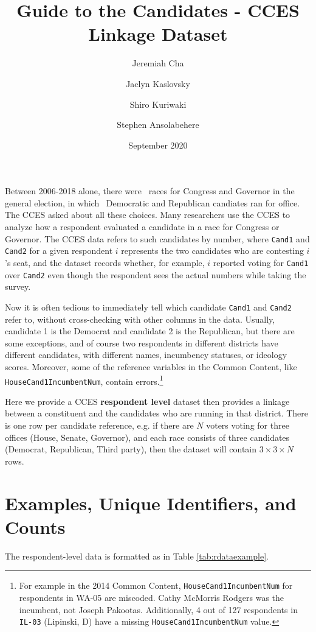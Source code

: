\documentclass[12pt]{article}
\title{\large\textbf{Guide to the Candidates - CCES Linkage Dataset}}
\author[1]{\normalsize Jeremiah Cha}
\author[2]{\normalsize Jaclyn Kaslovsky}
\author[3]{\normalsize Shiro Kuriwaki}
\author[1]{\normalsize Stephen Ansolabehere}
\affil[1]{\footnotesize Department of Government, Harvard University.}
\affil[2]{\footnotesize Department of Political Science, Rice University}
\affil[3]{\footnotesize To be Department of Political Science, Yale University}
\date{\normalsize September 2020}
\begin{document}
\maketitle 


Between 2006-2018 alone, there were \unskip \ races for Congress and Governor in the general election, in which \unskip \ Democratic and Republican candiates ran for office. The CCES asked about all these choices. Many researchers use the CCES to analyze how a respondent evaluated a candidate in a race for Congress or Governor. The CCES data refers to such candidates by number, where \texttt{Cand1} and \texttt{Cand2}  for a given respondent \(i\) represents the two candidates who are contesting \(i\)'s seat, and the dataset records whether, for example, \(i\) reported voting for \texttt{Cand1} over \texttt{Cand2} even though the respondent sees the actual numbers while taking the survey.  


Now it is often tedious to immediately tell which candidate \texttt{Cand1} and \texttt{Cand2} refer to, without cross-checking with other columns in the data. Usually, candidate 1 is the Democrat and candidate 2 is the Republican, but there are some exceptions, and of course two respondents in different districts have different candidates, with different names, incumbency statuses, or ideology scores. Moreover, some of the reference variables in the Common Content, like \texttt{HouseCand1IncumbentNum}, contain errors.\footnote{For example in the 2014 Common Content, \texttt{HouseCand1IncumbentNum} for respondents in WA-05 are miscoded. Cathy McMorris Rodgers was the incumbent, not Joseph Pakootas. Additionally, 4 out of 127 respondents in \texttt{IL-03} (Lipinski, D) have a missing \texttt{HouseCand1IncumbentNum} value.}

Here we provide a CCES \textbf{respondent level} dataset then provides a linkage between a constituent and the candidates who are running in that district. There is one row per candidate reference, e.g. if there are $N$ voters voting for three offices (House, Senate, Governor), and each race consists of three candidates (Democrat, Republican, Third party), then the dataset will contain $3\times3\times N$ rows.


\section{Examples, Unique Identifiers, and Counts}

The respondent-level data is formatted as in Table \ref{tab:rdataexample}.
\end{document}
